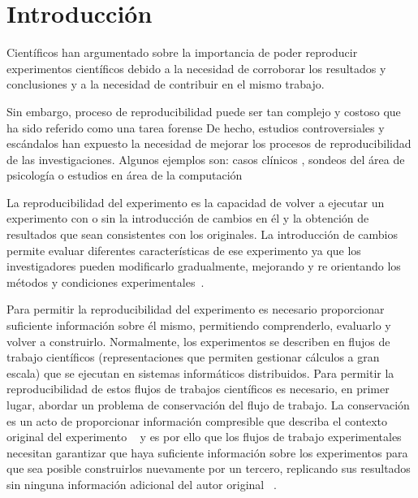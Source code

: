\chapter{Introducción}
\label{Chapter1} 
\newcommand{\keyword}[1]{\textbf{#1}}
\newcommand{\tabhead}[1]{\textbf{#1}}
\newcommand{\code}[1]{\texttt{#1}}
\newcommand{\file}[1]{\texttt{\bfseries#1}}
\newcommand{\option}[1]{\texttt{\itshape#1}}

Científicos han argumentado sobre la importancia de poder reproducir experimentos científicos debido a la necesidad de corroborar los resultados y conclusiones y a la necesidad de contribuir en el mismo trabajo. 

Sin embargo, proceso de reproducibilidad puede ser tan complejo y costoso que ha sido referido como una tarea forense \cite{baggerly2009deriving}
De hecho, estudios controversiales y escándalos han expuesto la necesidad de mejorar los procesos de reproducibilidad de las investigaciones. Algunos ejemplos son: casos clínicos \cite{ioannidis2009repeatability}, sondeos del área de psicología \cite{open2015estimating} o estudios en área de la computación \cite{baggerly2009deriving}

La reproducibilidad del experimento es la capacidad de volver a ejecutar un experimento con o sin la introducción de cambios en él y la obtención de resultados que sean consistentes con los originales.
La introducción de cambios permite evaluar diferentes características de ese experimento ya que los investigadores pueden modificarlo gradualmente, mejorando y re orientando los métodos y condiciones experimentales~\cite{stodden2010reproducible}.

Para permitir la reproducibilidad del experimento es necesario proporcionar suficiente información sobre él mismo, permitiendo comprenderlo, evaluarlo y volver a construirlo. Normalmente, los experimentos se describen en flujos de trabajo científicos (representaciones que permiten gestionar cálculos a gran escala) que se ejecutan en sistemas informáticos distribuidos. 
Para permitir la reproducibilidad de estos flujos de trabajos científicos es necesario, en primer lugar, abordar un problema de conservación del flujo de trabajo. 
La conservación es un acto de proporcionar información compresible que describa el contexto original del experimento ~\cite{conservation} y es por ello que los flujos de trabajo experimentales necesitan garantizar que haya suficiente información sobre los experimentos para que sea posible construirlos nuevamente por un tercero, replicando sus resultados sin ninguna información adicional del autor original ~\cite{garijo2013quantifying}. 

